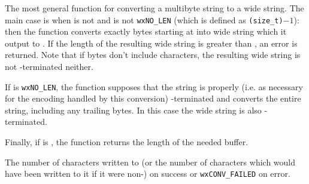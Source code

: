 
The most general function for converting a multibyte string to a wide string.
The main case is when  is not \NULL and  is not 
\texttt{wxNO\_LEN} (which is defined as \texttt{(size\_t)$-1$}): then
the function converts exactly  bytes starting at  into
wide string which it output to . If the length of the resulting wide
string is greater than , an error is returned. Note that if 
 bytes don't include \NUL characters, the resulting wide string is
not \NUL-terminated neither.

If  is \texttt{wxNO\_LEN}, the function supposes that the string is
properly (i.e. as necessary for the encoding handled by this conversion) 
\NUL-terminated and converts the entire string, including any trailing \NUL 
bytes. In this case the wide string is also \NUL-terminated.

Finally, if  is \NULL, the function returns the length of the needed
buffer.


The number of characters written to  (or the number of characters
which would have been written to it if it were non-\NULL) on success or 
\texttt{wxCONV\_FAILED} on error.


